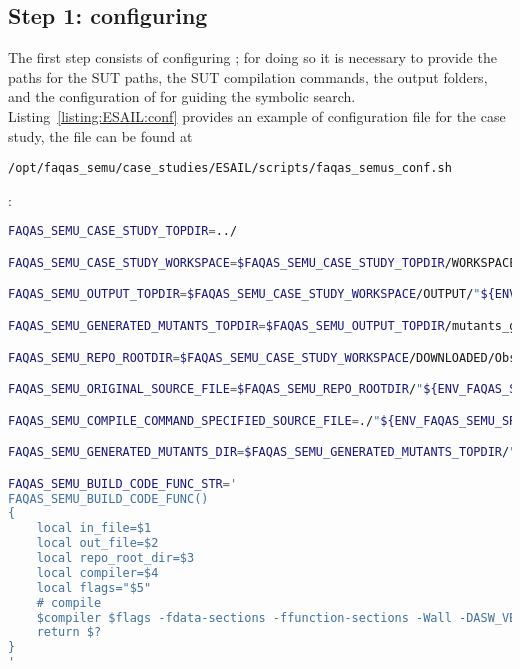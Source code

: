 \subsection{Step 1: configuring \SEMUS}

The first step consists of configuring \SEMUS; for doing so it is necessary to provide the paths for the SUT paths, the SUT compilation commands, the output folders, and the configuration of \SEMU for guiding the symbolic search. Listing~\ref{listing:ESAIL:conf} provides an example of configuration file for the case study, the file can be found at \begin{footnotesize}\texttt{/opt/faqas\_semu/case\_studies/ESAIL/scripts/faqas\_semus\_conf.sh}\end{footnotesize}:

\begin{lstlisting}[language=bash,label=listing:ESAIL:conf,caption=faqas\_semus\_conf.sh file for ESAIL case study.]
FAQAS_SEMU_CASE_STUDY_TOPDIR=../

FAQAS_SEMU_CASE_STUDY_WORKSPACE=$FAQAS_SEMU_CASE_STUDY_TOPDIR/WORKSPACE

FAQAS_SEMU_OUTPUT_TOPDIR=$FAQAS_SEMU_CASE_STUDY_WORKSPACE/OUTPUT/"${ENV_FAQAS_SEMU_SRC_FILE%.c}"

FAQAS_SEMU_GENERATED_MUTANTS_TOPDIR=$FAQAS_SEMU_OUTPUT_TOPDIR/mutants_generation

FAQAS_SEMU_REPO_ROOTDIR=$FAQAS_SEMU_CASE_STUDY_WORKSPACE/DOWNLOADED/Obsw

FAQAS_SEMU_ORIGINAL_SOURCE_FILE=$FAQAS_SEMU_REPO_ROOTDIR/"${ENV_FAQAS_SEMU_SRC_FILE}"

FAQAS_SEMU_COMPILE_COMMAND_SPECIFIED_SOURCE_FILE=./"${ENV_FAQAS_SEMU_SRC_FILE}"

FAQAS_SEMU_GENERATED_MUTANTS_DIR=$FAQAS_SEMU_GENERATED_MUTANTS_TOPDIR/"${ENV_FAQAS_SEMU_SRC_FILE%.c}"

FAQAS_SEMU_BUILD_CODE_FUNC_STR='
FAQAS_SEMU_BUILD_CODE_FUNC()
{
    local in_file=$1
    local out_file=$2
    local repo_root_dir=$3
    local compiler=$4
    local flags="$5"
    # compile
    $compiler $flags -fdata-sections -ffunction-sections -Wall -DASW_VERSION_MAJOR=4 -DASW_VERSION_MINOR=1 -DSVN_REVISION=0 -DDEBUG -DUNIT_TEST -O0 -g -DTARGET -I$repo_root_dir/Source/_Ext/check_for_target/include/ -DLOG_WCET -DSCHEDULER_TRACKING -I$repo_root_dir/Source/./. -I$repo_root_dir/Source/ApplicationLayer/. -I$repo_root_dir/Source/ServiceLayer/. -I$repo_root_dir/Source/HighLevelDriverLayer/. -I$repo_root_dir/Source/HighLevelDriverLayer/CAN_Handler/Private/. -I$repo_root_dir/Source/ProtocolLayer/. -I$repo_root_dir/Source/LowLevelDriverLayer/. -I$repo_root_dir/Source/Utilities/. -I/opt/rtems-4.8-SAT-AIS/sparc-rtems4.8/leon3/lib/include -I$repo_root_dir/Source/_Ext/mlfs/include -o $out_file $in_file $flags
    return $?
}
'


\end{lstlisting}
